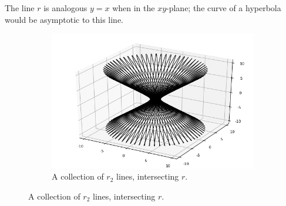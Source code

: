 \documentclass[12pt]{article}
\begin{document}
The line $r$ is analogous $y=x$ when in the $xy$-plane; the curve of a hyperbola would be asymptotic to this line.

\begin{figure}[h!]
  \centering
      \begin{subfigure}[b]{0.6\linewidth}
    \includegraphics[width=\linewidth]{./assets/4-1-3/hyperboloid-line-rotation-skew.png}
    \caption*{A collection of $r_2$ lines, intersecting $r$.}
  \end{subfigure}
  \end{figure}
\end{document}
